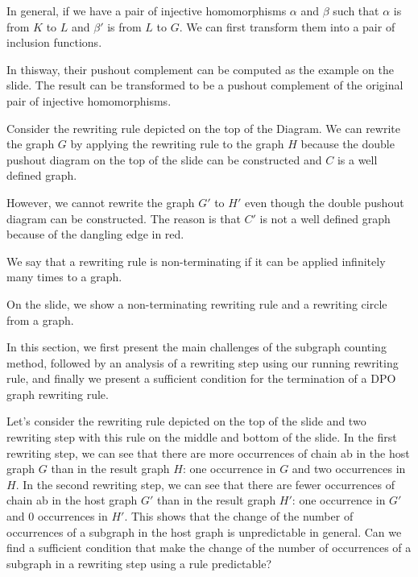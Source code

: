         In general, if we have a pair of injective homomorphisms $\alpha$ and $\beta$ such that $\alpha$ is from $K$ to $L$ and $\beta'$ is from $L$ to $G$. We can first transform them into a pair of inclusion functions.
       
        In thisway, their pushout complement can be computed as the example on the slide. The result can be transformed to be a pushout complement of the original pair of injective homomorphisms.





         Consider the rewriting rule depicted on the top of the Diagram.
        We can rewrite the graph \( G \) by applying the rewriting rule to the graph \(H\) because the double pushout diagram on the top of the slide can be constructed and \(C\) is a well defined graph.

        However, we cannot rewrite the graph \( G' \) to \(H'\) even though the double pushout diagram can be constructed. The reason is that \(C'\) is not a well defined graph because of the dangling edge in red.




         We say that a rewriting rule is non-terminating if it can be applied infinitely many times to a graph.

            On the slide, we show a non-terminating rewriting rule and a rewriting circle from a graph. 



            In this section, we first present the main challenges of the subgraph counting method, followed by an analysis of a rewriting step using our running rewriting rule, and finally we present a sufficient condition for the termination of a DPO graph rewriting rule.



            Let's consider the rewriting rule depicted on the top of the slide and two rewriting step with this rule on the middle and bottom of the slide.
        In the first rewriting step, we can see that there are more occurrences of chain ab in the host graph $G$ than in the result graph $H$: one occurrence in $G$ and two occurrences in $H$.
        In the second rewriting step, we can see that there are fewer occurrences of chain ab in the host graph $G'$ than in the result graph $H'$: one occurrence in $G'$ and 0 occurrences in $H'$.
        This shows that the change of the number of occurrences of a subgraph in the host graph is unpredictable in general.
        Can we find a sufficient condition that make the change of the number of occurrences of a subgraph in a rewriting step using a rule predictable?



